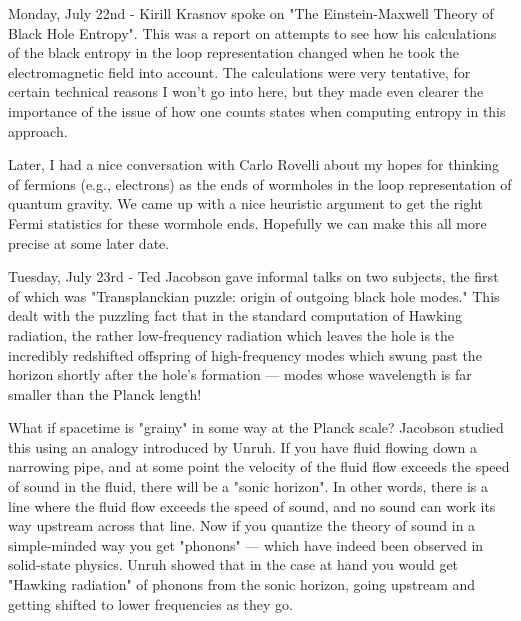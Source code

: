 Monday, July 22nd - Kirill Krasnov spoke on "The Einstein-Maxwell
Theory of Black Hole Entropy".  This was a report on attempts to see how
his calculations of the black entropy in the loop representation changed
when he took the electromagnetic field into account.  The calculations
were very tentative, for certain technical reasons I won't go into here,
but they made even clearer the importance of the issue of how one counts
states when computing entropy in this approach.

Later, I had a nice conversation with Carlo Rovelli about my hopes
for thinking of fermions (e.g., electrons) as the ends of wormholes
in the loop representation of quantum gravity.  We came up with a nice
heuristic argument to get the right Fermi statistics for these wormhole
ends.  Hopefully we can make this all more precise at some later date.

Tuesday, July 23rd - Ted Jacobson gave informal talks on two subjects,
the first of which was "Transplanckian puzzle: origin of outgoing
black hole modes."  This dealt with the puzzling fact that in the
standard computation of Hawking radiation, the rather low-frequency
radiation which leaves the hole is the incredibly redshifted offspring
of high-frequency modes which swung past the horizon shortly after the
hole's formation --- modes whose wavelength is far smaller than the
Planck length!  

What if spacetime is "grainy" in some way at the Planck scale?
Jacobson studied this using an analogy introduced by Unruh.  If you
have fluid flowing down a narrowing pipe, and at some point the
velocity of the fluid flow exceeds the speed of sound in the fluid,
there will be a "sonic horizon".  In other words, there is a line
where the fluid flow exceeds the speed of sound, and no sound can work
its way upstream across that line.  Now if you quantize the theory of
sound in a simple-minded way you get "phonons" --- which have indeed
been observed in solid-state physics.  Unruh showed that in the case
at hand you would get "Hawking radiation" of phonons from the sonic
horizon, going upstream and getting shifted to lower frequencies as
they go.  

